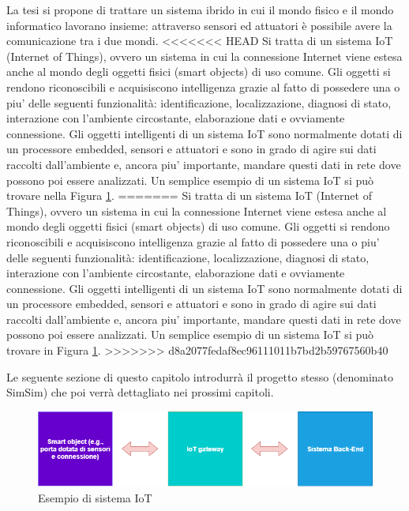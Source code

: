 \documentclass[12pt]{report}
\begin{document}
La tesi si propone di trattare un sistema ibrido in cui il mondo fisico e il mondo informatico lavorano insieme: attraverso sensori ed attuatori è possibile avere la comunicazione tra i due mondi. 
<<<<<<< HEAD
Si tratta di un sistema IoT (Internet of Things), ovvero un sistema in cui la connessione Internet viene estesa anche al mondo degli oggetti fisici (smart objects\cite{smart_objects}) di uso comune. Gli oggetti si rendono riconoscibili e acquisiscono intelligenza grazie al fatto di possedere una o piu' delle seguenti funzionalità: identificazione, localizzazione, diagnosi di stato, interazione con l'ambiente circostante, elaborazione dati e ovviamente connessione.
Gli oggetti intelligenti di un sistema IoT sono normalmente dotati di un processore embedded, sensori e attuatori e sono in grado di agire sui dati raccolti dall'ambiente e, ancora piu' importante, mandare questi dati in rete dove possono poi essere analizzati\cite{IoT}. Un semplice esempio di un sistema IoT si può trovare nella Figura \ref{fig:iot_diagram}.
=======
Si tratta di un sistema IoT (Internet of Things), ovvero un sistema in cui la connessione Internet viene estesa anche al mondo degli oggetti fisici (smart objects\cite{smart_objects}) di uso comune. Gli oggetti si rendono riconoscibili e acquisiscono intelligenza grazie al fatto di possedere una o piu' delle seguenti funzionalità: identificazione, localizzazione, diagnosi di stato, interazione con l'ambiente circostante, elaborazione dati e ovviamente connessione.
Gli oggetti intelligenti di un sistema IoT sono normalmente dotati di un processore embedded, sensori e attuatori e sono in grado di agire sui dati raccolti dall'ambiente e, ancora piu' importante, mandare questi dati in rete dove possono poi essere analizzati\cite{IoT}. Un semplice esempio di un sistema IoT si può trovare in Figura \ref{fig:iot_diagram}.
>>>>>>> d8a2077fedaf8ec96111011b7bd2b59767560b40

Le seguente sezione di questo capitolo introdurrà il progetto stesso (denominato SimSim) che poi verrà dettagliato nei prossimi capitoli.

\begin{figure}
	\includegraphics[width=\linewidth]{./img/iot_diagram.png}
	\caption{Esempio di sistema IoT}
	\label{fig:iot_diagram}
\end{figure}
\end{document}
